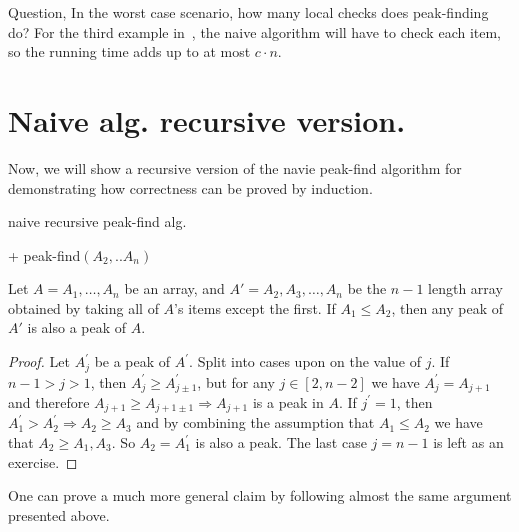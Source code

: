 Question, In the worst case scenario, how many local checks does peak-finding do? For the third example in~, the naive algorithm will have to check each item, so the running time adds up to at most $c \cdot n$.

\section{Naive alg. recursive version.}
Now, we will show a recursive version of the navie peak-find algorithm for demonstrating how correctness can be proved by induction. 
\begin{algorithm}
\caption{naive recursive peak-find alg.}
  + peak-find$(A_{2}, .. A_{n})$
 \end{algorithm}

 \begin{claim} \label{claim:subarray} 
Let $A = A_1, \dots, A_n$ be an array, and $A' = A_2, A_3, \dots, A_n$ be the $n-1$ length array obtained by taking all of $A$'s items except the first. If $A_1 \le A_2$, then any peak of $A'$ is also a peak of $A$.
\end{claim}
\begin{proof} 
Let $A^{\prime}_{j}$ be a peak of $A^{\prime}$. Split into cases upon on the value of $j$. If $n-1 > j > 1$, then $A^{\prime}_{j} \ge A^{\prime}_{j \pm 1}$, but for any $j \in [2, n-2]$ we have $A^{\prime}_{j} = A_{j+1}$ and therefore $A_{j+1} \ge A_{j+1 \pm 1} \Rightarrow A_{j+1}$ is a peak in $A$. If $j^{\prime} = 1$, then $A^{\prime}_{1} > A^{\prime}_{2} \Rightarrow A_{2} \ge A_{3}$ and by combining the assumption that $A_{1} \le A_{2}$ we have that $A_{2} \ge A_{1}, A_{3}$. So $A_{2} = A^{\prime}_{1}$ is also a peak. The last case $j = n-1$ is left as an exercise.
\end{proof}

One can prove a much more general claim by following almost the same argument presented above.

